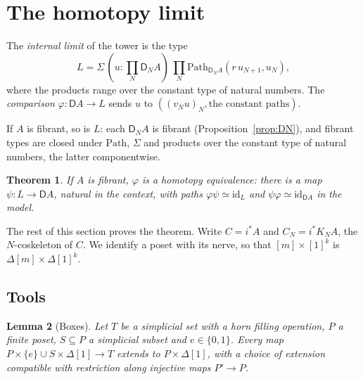 \documentclass[11pt]{article}
\newcommand{\Path}{\mathrm{Path}}
\newcommand{\id}{\mathrm{id}}
\newcommand{\D}{\mathsf{D}}
\theoremstyle{plain}
\newtheorem{theorem}{Theorem}[section]
\newtheorem{lemma}[theorem]{Lemma}
\theoremstyle{definition}
\theoremstyle{remark}
\begin{document}
\section{The homotopy limit}\label{sec:hlim}

The \emph{internal limit} of the tower is the type
\[
L=\Sigma\,(u:\textstyle\prod_N\D_NA)\,\prod_N\Path_{\D_NA}(r\,u_{N+1},u_N),
\]
where the products range over the constant type of natural numbers. The
\emph{comparison} $\varphi:\D A\to L$ sends $u$ to $((v_Nu)_N,\text{the
constant paths})$.

If $A$ is fibrant, so is $L$: each $\D_NA$ is fibrant
(Proposition~\ref{prop:DN}), and fibrant types are closed under $\Path$,
$\Sigma$ and products over the constant type of natural numbers, the
latter componentwise.

\begin{theorem}\label{thm:hlim}
If $A$ is fibrant, $\varphi$ is a homotopy equivalence: there is a map
$\psi:L\to\D A$, natural in the context, with paths
$\varphi\psi\simeq\id_L$ and $\psi\varphi\simeq\id_{\D A}$ in the model.
\end{theorem}

The rest of this section proves the theorem. Write $C=i^*A$ and
$C_N=i^*K_NA$, the $N$-coskeleton of $C$. We identify a poset with its
nerve, so that $[m]\times[1]^k$ is $\Delta[m]\times\Delta[1]^k$.

\subsection{Tools}

\begin{lemma}[Boxes]\label{lem:box}
Let $T$ be a simplicial set with a horn filling operation, $P$ a finite
poset, $S\subseteq P$ a simplicial subset and $e\in\{0,1\}$. Every map
$P\times\{e\}\cup S\times\Delta[1]\to T$ extends to $P\times\Delta[1]$,
with a choice of extension compatible with restriction along injective
maps $P'\to P$.
\end{lemma}
\end{document}
